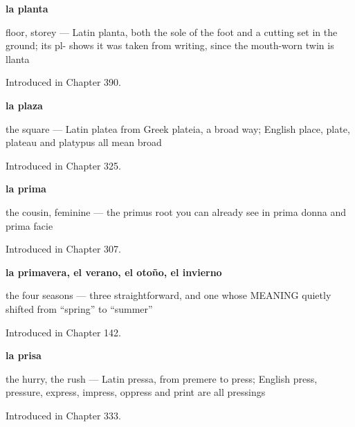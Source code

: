 \noindent\begin{minipage}[t]{\linewidth}
\raggedright
\textbf{la planta}\par
\small floor, storey — Latin planta, both the sole of the foot and a cutting set in the ground; its pl- shows it was taken from writing, since the mouth-worn twin is llanta\par
\footnotesize Introduced in Chapter 390.
\end{minipage}\par\medskip

\noindent\begin{minipage}[t]{\linewidth}
\raggedright
\textbf{la plaza}\par
\small the square — Latin platea from Greek plateia, a broad way; English place, plate, plateau and platypus all mean broad\par
\footnotesize Introduced in Chapter 325.
\end{minipage}\par\medskip

\noindent\begin{minipage}[t]{\linewidth}
\raggedright
\textbf{la prima}\par
\small the cousin, feminine --- the primus root you can already see in prima donna and prima facie\par
\footnotesize Introduced in Chapter 307.
\end{minipage}\par\medskip

\noindent\begin{minipage}[t]{\linewidth}
\raggedright
\textbf{la primavera, el verano, el otoño, el invierno}\par
\small the four seasons — three straightforward, and one whose MEANING quietly shifted from \textquotedblleft{}spring\textquotedblright{} to \textquotedblleft{}summer\textquotedblright{}\par
\footnotesize Introduced in Chapter 142.
\end{minipage}\par\medskip

\noindent\begin{minipage}[t]{\linewidth}
\raggedright
\textbf{la prisa}\par
\small the hurry, the rush — Latin pressa, from premere to press; English press, pressure, express, impress, oppress and print are all pressings\par
\footnotesize Introduced in Chapter 333.
\end{minipage}\par\medskip


